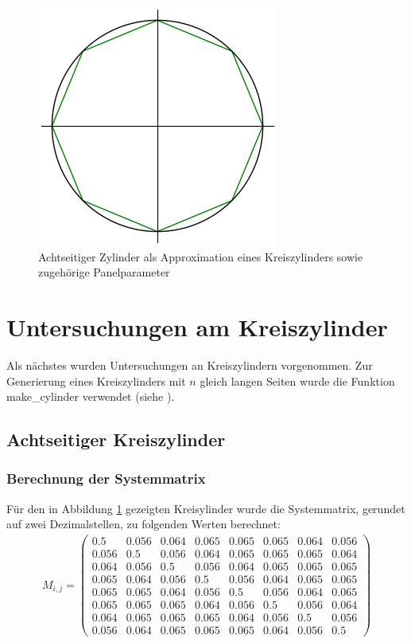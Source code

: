 \begin{figure}[!h]
\begin{center}
\includegraphics[scale=0.7]{figures/cylinderascircle.png} 
\caption{Achtseitiger Zylinder als Approximation eines Kreiszylinders sowie zugehörige Panelparameter}
\label{fig:cylinder8}
\end{center}
\end{figure}
\section{Untersuchungen am  Kreiszylinder}

Als nächstes wurden Untersuchungen an Kreiszylindern vorgenommen. Zur Generierung eines Kreiszylinders mit $n$ gleich langen Seiten wurde die Funktion make\_cylinder verwendet (siehe ).
\subsection{Achtseitiger Kreiszylinder}
\subsubsection{Berechnung der Systemmatrix}
Für den in Abbildung \ref{fig:cylinder8} gezeigten Kreisylinder wurde die Systemmatrix, gerundet auf zwei Dezimalstellen, zu folgenden Werten berechnet:
\begin{align*}
M_{i,j} = 
\begin{pmatrix}
0.5&0.056&0.064&0.065&0.065&0.065&0.064&0.056 \\
0.056&0.5&0.056&0.064&0.065&0.065&0.065&0.064\\
0.064&0.056&0.5&0.056&0.064&0.065&0.065&0.065\\
0.065&0.064&0.056&0.5&0.056&0.064&0.065&0.065\\
0.065&0.065&0.064&0.056&0.5&0.056&0.064&0.065\\
0.065&0.065&0.065&0.064&0.056&0.5&0.056&0.064\\
0.064&0.065&0.065&0.065&0.064&0.056&0.5&0.056\\
0.056&0.064&0.065&0.065&0.065&0.064&0.056&0.5
\end{pmatrix}
\end{align*}
